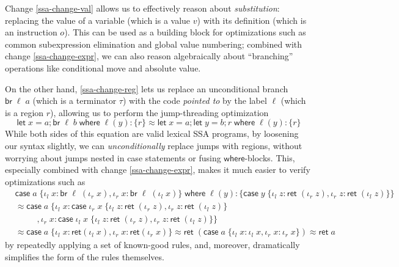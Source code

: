 \documentclass[acmsmall,screen,review]{acmart}
\newcommand{\ms}[1]{\ensuremath{\mathsf{#1}}}
\newcommand{\lto}{:}
\newcommand{\linl}[1]{\iota_l\;{#1}}
\newcommand{\linr}[1]{\iota_r\;{#1}}
\newcommand{\letstmt}[3]{\ensuremath{\ms{let}\;#1 = #2; #3}}
\newcommand{\brb}[2]{\ms{br}\;#1\;#2}
\newcommand{\casestmt}[5]{\ms{case}\;#1\;\{\linl{#2} \lto #3, \linr{#4} \lto #5\}}
\newcommand{\where}[2]{#1\;\ms{where}\;#2}
\newcommand{\wbranch}[3]{#1(#2) \lto \{#3\}}
\newcommand{\teqv}{\approx}
\begin{document}
Change \ref{ssa-change-val} allows us to effectively reason about \emph{substitution}: replacing the
value of a variable (which is a value $v$) with its definition (which is an instruction $o$). This
can be used as a building block for optimizations such as common subexpression elimination and
global value numbering; combined with change \ref{ssa-change-expr}, we can also reason algebraically
about ``branching'' operations like conditional move and absolute value.

On the other hand, \ref{ssa-change-reg} lets us replace an unconditional branch $\brb{\ell}{a}$
(which is a terminator $\tau$) with the code \emph{pointed to} by the label $\ell$ (which is a
region $r$), allowing us to perform the jump-threading optimization
\begin{equation*}
  \where{\letstmt{x}{a}{\brb{\ell}{b}}}{\wbranch{\ell}{y}{r}}
  \teqv \where{\letstmt{x}{a}{\letstmt{y}{b}{r}}}{\wbranch{\ell}{y}{r}}
\end{equation*}
While both sides of this equation are valid lexical SSA programs, by loosening our syntax slightly,
we can \emph{unconditionally} replace jumps with regions, without worrying about jumps nested in
case statements or fusing \ms{where}-blocks. This, especially combined with change
\ref{ssa-change-expr}, makes it much easier to verify optimizations such as
\begin{align*}
  & \where{\casestmt{a}{x}{\brb{\ell}{(\iota_r\;x)}}{x}{\brb{\ell}{(\iota_l\;x)}}}
        {\wbranch{\ell}{y}{
          \casestmt{y}{z}{\ms{ret}\;(\iota_r\;z)}{z}{\ms{ret}\;(\iota_l\;z)}
        }} \\
  &\teqv \casestmt{a} 
      {x}{\casestmt{\iota_r\;x}{z}{\ms{ret}\;(\iota_r\;z)}{z}{\ms{ret}\;(\iota_l\;z)}   
        \\ & \qquad\;\;}
      {x}{\casestmt{\iota_l\;x}{z}{\ms{ret}\;(\iota_r\;z)}{z}{\ms{ret}\;(\iota_l\;z)}} \\
  &\teqv \casestmt{a}
      {x}{\ms{ret}(\iota_l\;x)}
      {x}{\ms{ret}(\iota_r\;x)}
   \teqv \ms{ret}\;(\casestmt{a}{x}{\iota_l\;x}{x}{\iota_r\;x})
   \teqv \ms{ret}\;a
\end{align*}
by repeatedly applying a set of known-good rules, and, moreover, dramatically simplifies the form of
the rules themselves.
\end{document}
